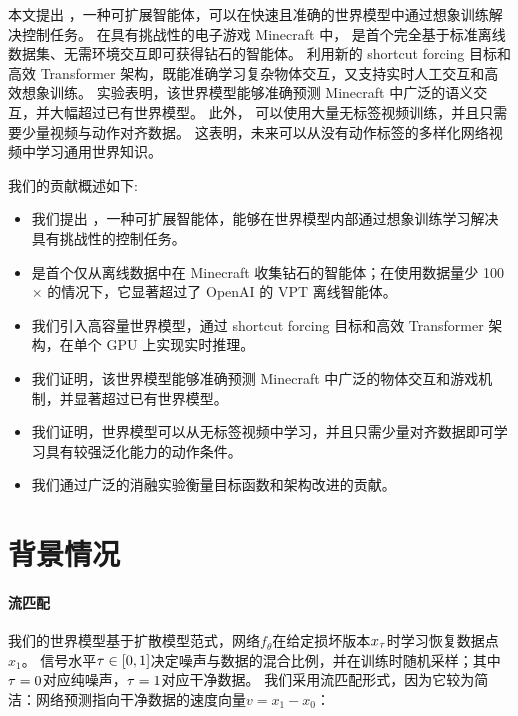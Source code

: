 \documentclass[11pt]{article}
\begin{document}
本文提出 \method{}，一种可扩展智能体，可以在快速且准确的世界模型中通过想象训练解决控制任务。
在具有挑战性的电子游戏 Minecraft 中，\method{} 是首个完全基于标准离线数据集、无需环境交互即可获得钻石的智能体。
\method{} 利用新的 shortcut forcing 目标和高效 Transformer 架构，既能准确学习复杂物体交互，又支持实时人工交互和高效想象训练。
实验表明，该世界模型能够准确预测 Minecraft 中广泛的语义交互，并大幅超过已有世界模型。
此外，\method{} 可以使用大量无标签视频训练，并且只需要少量视频与动作对齐数据。
这表明，未来可以从没有动作标签的多样化网络视频中学习通用世界知识。

我们的贡献概述如下:

\begin{itemize}
\item 我们提出 \method{}，一种可扩展智能体，能够在世界模型内部通过想象训练学习解决具有挑战性的控制任务。
\item \method{} 是首个仅从离线数据中在 Minecraft 收集钻石的智能体；在使用数据量少 100$\times$ 的情况下，它显著超过了 OpenAI 的 VPT 离线智能体\citep{vpt}。
\item 我们引入高容量世界模型，通过 shortcut forcing 目标和高效 Transformer 架构，在单个 GPU 上实现实时推理。
\item 我们证明，该世界模型能够准确预测 Minecraft 中广泛的物体交互和游戏机制，并显著超过已有世界模型。
\item 我们证明，世界模型可以从无标签视频中学习，并且只需少量对齐数据即可学习具有较强泛化能力的动作条件。
\item 我们通过广泛的消融实验衡量目标函数和架构改进的贡献。
\end{itemize}

\section{背景情况}
\label{sec:background}

\paragraph{流匹配}

我们的世界模型基于扩散模型范式\citep{sohl2015deep,ddpm}，网络$f_\theta$在给定损坏版本$x_\tau$时学习恢复数据点$x_1$。
信号水平$\tau \in [0, 1]$决定噪声与数据的混合比例，并在训练时随机采样；其中$\tau=0$对应纯噪声，$\tau=1$对应干净数据。
我们采用流匹配形式\citep{flowmatching,rectifiedflow}，因为它较为简洁：网络预测指向干净数据的速度向量$v = x_1 - x_0$：

\end{document}
